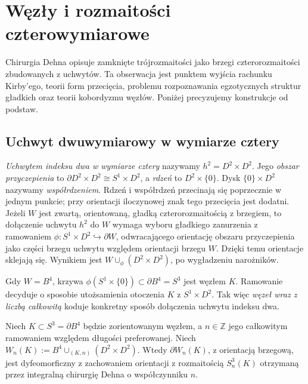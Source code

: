 \chapter{Węzły i rozmaitości czterowymiarowe}
\label{ch:kt-cztery}

Chirurgia Dehna opisuje zamknięte trójrozmaitości jako brzegi
czterorozmaitości zbudowanych z uchwytów. Ta obserwacja jest
punktem wyjścia rachunku Kirby'ego, teorii form przecięcia,
problemu rozpoznawania egzotycznych struktur gładkich oraz
teorii kobordyzmu węzłów. Poniżej precyzujemy konstrukcje
od podstaw.

\section{Uchwyt dwuwymiarowy w wymiarze cztery}
\label{sec:kt-uchwyty}

\begin{definicja}
\emph{Uchwytem indeksu dwa w wymiarze cztery} nazywamy
$h^2=D^2\times D^2$. Jego \emph{obszar przyczepienia}
to $\partial D^2\times D^2\cong S^1\times D^2$,
a \emph{rdzeń} to $D^2\times\{0\}$.
Dysk $\{0\}\times D^2$ nazywamy \emph{współrdzeniem}.
Rdzeń i współrdzeń przecinają się poprzecznie
w jednym punkcie; przy orientacji iloczynowej
znak tego przecięcia jest dodatni.
Jeżeli $W$ jest zwartą, orientowaną, gładką czterorozmaitością
z brzegiem, to dołączenie uchwytu $h^2$ do $W$ wymaga
wyboru gładkiego zanurzenia z ramowaniem
$\phi\colon S^1\times D^2\hookrightarrow\partial W$,
odwracającego orientację obszaru przyczepienia
jako części brzegu uchwytu względem orientacji
brzegu $W$. Dzięki temu orientacje sklejają się.
Wynikiem jest $W\cup_\phi(D^2\times D^2)$, po wygładzeniu
narożników.
\end{definicja}

Gdy $W=B^4$, krzywa $\phi(S^1\times\{0\})\subset\partial B^4=S^3$
jest węzłem $K$. Ramowanie decyduje o sposobie utożsamienia
otoczenia $K$ z $S^1\times D^2$. Tak więc \emph{węzeł wraz
z liczbą całkowitą} koduje konkretny sposób dołączenia
uchwytu indeksu dwa.

\begin{twierdzenie}
\label{thm:kt-handle-boundary}
Niech $K\subset S^3=\partial B^4$ będzie zorientowanym węzłem,
a $n\in\mathbb Z$ jego całkowitym ramowaniem względem długości
preferowanej. Niech
$W_n(K):=B^4\cup_{(K,n)}(D^2\times D^2)$.
Wtedy $\partial W_n(K)$, z orientacją brzegową, jest
dyfeomorficzny z zachowaniem orientacji z rozmaitością $S^3_n(K)$
otrzymaną przez integralną chirurgię Dehna o współczynniku $n$.
\end{twierdzenie}


